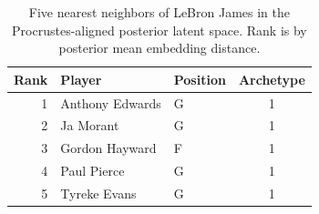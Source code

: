 \begin{table}[htbp]
  \centering\small
  \begin{tabular}{rllc}
    \toprule
    Rank & Player & Position & Archetype \\
    \midrule
    1 & Anthony Edwards & G & 1 \\
    2 & Ja Morant & G & 1 \\
    3 & Gordon Hayward & F & 1 \\
    4 & Paul Pierce & G & 1 \\
    5 & Tyreke Evans & G & 1 \\
    \bottomrule
  \end{tabular}
  \caption{Five nearest neighbors of LeBron James in the Procrustes-aligned posterior latent space. Rank is by posterior mean embedding distance.}
  \label{tab:LeBron_James_neighbors}
\end{table}

